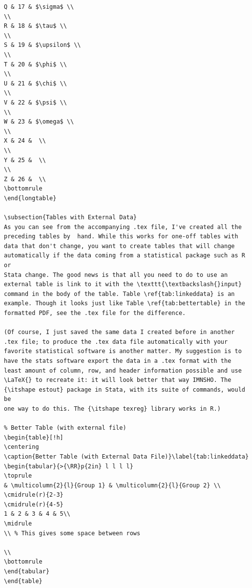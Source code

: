 \documentclass[12pt]{article}
\newcommand{\RR}{\raggedright\arraybackslash} %
\begin{document}
\begin{verbatim}
Q & 17 & $\sigma$ \\
\\
R & 18 & $\tau$ \\
\\
S & 19 & $\upsilon$ \\
\\
T & 20 & $\phi$ \\
\\
U & 21 & $\chi$ \\
\\
V & 22 & $\psi$ \\
\\
W & 23 & $\omega$ \\
\\
X & 24 &  \\
\\
Y & 25 &  \\
\\
Z & 26 &  \\
\bottomrule
\end{longtable}

\subsection{Tables with External Data}
As you can see from the accompanying .tex file, I've created all the
preceding tables by  hand. While this works for one-off tables with
data that don't change, you want to create tables that will change
automatically if the data coming from a statistical package such as R or
Stata change. The good news is that all you need to do to use an
external table is link to it with the \texttt{\textbackslash{}input}
command in the body of the table. Table \ref{tab:linkeddata} is an
example. Though it looks just like Table \ref{tab:bettertable} in the
formatted PDF, see the .tex file for the difference.

(Of course, I just saved the same data I created before in another
.tex file; to produce the .tex data file automatically with your
favorite statistical software is another matter. My suggestion is to
have the stats software export the data in a .tex format with the
least amount of column, row, and header information possible and use
\LaTeX{} to recreate it: it will look better that way IMNSHO. The
{\itshape estout} package in Stata, with its suite of commands, would be
one way to do this. The {\itshape texreg} library works in R.)

% Better Table (with external file)
\begin{table}[!h]
\centering
\caption{Better Table (with External Data File)}\label{tab:linkeddata}
\begin{tabular}{>{\RR}p{2in} l l l l}
\toprule
& \multicolumn{2}{l}{Group 1} & \multicolumn{2}{l}{Group 2} \\
\cmidrule(r){2-3}
\cmidrule(r){4-5}
1 & 2 & 3 & 4 & 5\\
\midrule
\\ % This gives some space between rows

\\
\bottomrule
\end{tabular}
\end{table}


\end{verbatim}
\end{document}
